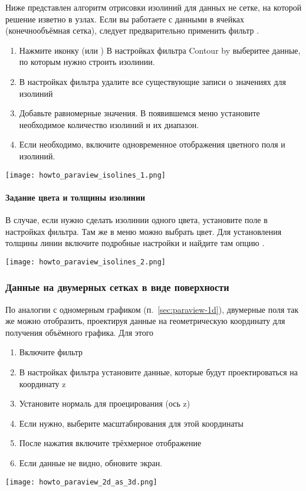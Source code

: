 Ниже представлен алгоритм отрисовки изолиний для данных не сетке,
на которой решение изветно в узлах.
Если вы работаете с данными в ячейках (конечнообъёмная сетка),
следует предварительно применить фильтр .

\begin{enumerate}
\item Нажмите иконку  (или )
      В настройках фильтра Contour by выберитее данные, по которым нужно строить изолинии.
\item В настройках фильтра удалите все существующие записи о значениях для изолиний
\item Добавьте равномерные значения. В появившемся меню установите необходимое количество изолиний и их диапазон.
\item Если необходимо, включите одновременное отображения цветного поля и изолиний.
\end{enumerate}

\begin{center}
\texttt{[image: howto\_paraview\_isolines\_1.png]}
\end{center}

\paragraph{Задание цвета и толщины изолинии}
В случае, если нужно сделать изолинии одного цвета, установите поле  в 
настройках фильтра. Там же в меню  можно выбрать цвет.
Для установления толщины линии включите подробные настройки и найдите там опцию .
\begin{center}
\texttt{[image: howto\_paraview\_isolines\_2.png]}
\end{center}

\subsubsection{Данные на двумерных сетках в виде поверхности}
\label{sec:paraview-2d}

По аналогии с  одномерным графиком (п.~\ref{sec:paraview-1d}), двумерные поля так же
можно отобразить, проектируя данные на геометрическую координату для получения
объёмного графика. Для этого
\begin{enumerate}
\item Включите фильтр 
\item В настройках фильтра установите данные, которые будут проектироваться на координату z
\item Установите нормаль для проецирования (ось z)
\item Если нужно, выберите масштабирования для этой координаты
\item После нажатия  включите трёхмерное отображение
\item Если данные не видно, обновите экран.
\end{enumerate}
\begin{center}
\texttt{[image: howto\_paraview\_2d\_as\_3d.png]}
\end{center}

